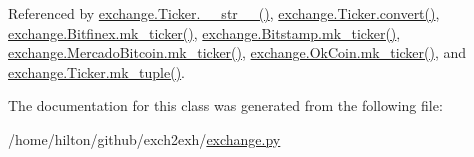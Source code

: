 Referenced by \hyperlink{exchange_8py_source_l00111}{exchange.\+Ticker.\+\_\+\+\_\+str\+\_\+\+\_\+()}, \hyperlink{exchange_8py_source_l00065}{exchange.\+Ticker.\+convert()}, \hyperlink{exchange_8py_source_l00346}{exchange.\+Bitfinex.\+mk\+\_\+ticker()}, \hyperlink{exchange_8py_source_l00415}{exchange.\+Bitstamp.\+mk\+\_\+ticker()}, \hyperlink{exchange_8py_source_l00549}{exchange.\+Mercado\+Bitcoin.\+mk\+\_\+ticker()}, \hyperlink{exchange_8py_source_l00614}{exchange.\+Ok\+Coin.\+mk\+\_\+ticker()}, and \hyperlink{exchange_8py_source_l00096}{exchange.\+Ticker.\+mk\+\_\+tuple()}.



The documentation for this class was generated from the following file\+:\begin{DoxyCompactItemize}
\item 
/home/hilton/github/exch2exh/\hyperlink{exchange_8py}{exchange.\+py}\end{DoxyCompactItemize}
